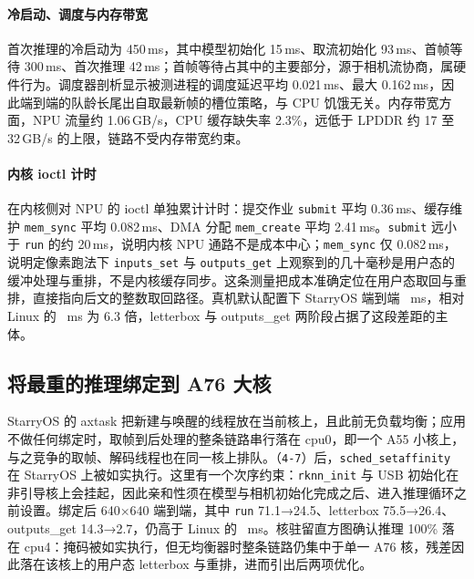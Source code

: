\paragraph{冷启动、调度与内存带宽}
首次推理的冷启动为 450\,ms，其中模型初始化 15\,ms、取流初始化 93\,ms、首帧等待 300\,ms、首次推理 42\,ms；首帧等待占其中的主要部分，源于相机流协商，属硬件行为。调度器剖析显示被测进程的调度延迟平均 0.021\,ms、最大 0.162\,ms，因此端到端的队龄长尾出自取最新帧的槽位策略，与 CPU 饥饿无关。内存带宽方面，NPU 流量约 1.06\,GB/s，CPU 缓存缺失率 2.3\%，远低于 LPDDR 约 17 至 32\,GB/s 的上限，链路不受内存带宽约束。

\paragraph{内核 ioctl 计时}
在内核侧对 NPU 的 ioctl 单独累计计时：提交作业 \texttt{submit} 平均 0.36\,ms、缓存维护 \texttt{mem\_sync} 平均 0.082\,ms、DMA 分配 \texttt{mem\_create} 平均 2.41\,ms。\texttt{submit} 远小于 \texttt{run} 的约 20\,ms，说明内核 NPU 通路不是成本中心；\texttt{mem\_sync} 仅 0.082\,ms，说明定像素跑法下 \texttt{inputs\_set} 与 \texttt{outputs\_get} 上观察到的几十毫秒是用户态的缓冲处理与重排，不是内核缓存同步。这条测量把成本准确定位在用户态取回与重排，直接指向后文的整数取回路径。真机默认配置下 StarryOS 端到端 \nEteDefault~ms，相对 Linux 的 \nEteBigLin~ms 为 6.3 倍，letterbox 与 outputs\_get 两阶段占据了这段差距的主体。

\subsection{将最重的推理绑定到 A76 大核}

StarryOS 的 axtask 把新建与唤醒的线程放在当前核上，且此前无负载均衡；应用不做任何绑定时，取帧到后处理的整条链路串行落在 cpu0，即一个 A55 小核上，与之竞争的取帧、解码线程也在同一核上排队。（\texttt{4-7}）后，\texttt{sched\_setaffinity} 在 StarryOS 上被如实执行。这里有一个次序约束：\texttt{rknn\_init} 与 USB 初始化在非引导核上会挂起，因此亲和性须在模型与相机初始化完成之后、进入推理循环之前设置。绑定后 640×640 端到端，其中 \texttt{run} 71.1→24.5、letterbox 75.5→26.4、outputs\_get 14.3→2.7，仍高于 Linux 的 \nEteBigLin~ms。核驻留直方图确认推理 100\% 落在 cpu4：掩码被如实执行，但无均衡器时整条链路仍集中于单一 A76 核，残差因此落在该核上的用户态 letterbox 与重排，进而引出后两项优化。



